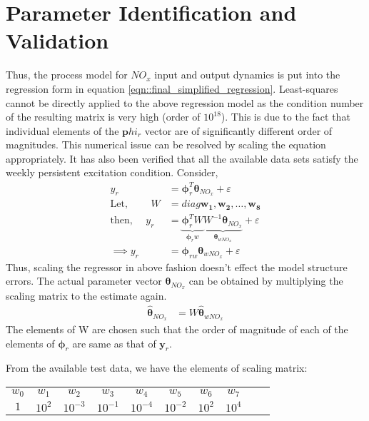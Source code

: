 \newpage
\section{Parameter Identification and Validation}

Thus, the process model for $NO_x$ input and output dynamics is put into the regression form in equation
\ref{eqn::final_simplified_regression}. Least-squares cannot be directly applied to the above regression model as the
condition number of the resulting matrix is very high (order of $10^{18}$). This is due to the fact that individual
elements of the $\pmb phi_r$ vector are of significantly different order of magnitudes. This numerical issue can be
resolved by scaling the equation appropriately. It has also been verified that all the available data sets satisfy the weekly persistent excitation condition. Consider,
\begin{align*}
        y_r &= \pmb \phi_r^T \pmb \theta_{NO_x} + \varepsilon\\
        \text{Let, } \qquad W &= diag \bm{w_1, w_2, \hdots, w_8}\\
        \text{then, } \quad y_r &= \underbrace{\pmb \phi_r^T  W}_{\pmb \phi_rw}
                        \underbrace{ W^{-1} \pmb \theta_{NO_x}}_{\pmb \theta_{wNO_x}} + \varepsilon\\
        \implies y_r &= \pmb \phi_{rw} \pmb \theta_{w NO_x} + \varepsilon
\end{align*}
Thus, scaling the regressor in above fashion doesn't effect the model structure errors. The actual parameter vector $\pmb \theta_{NO_x}$ can be obtained by multiplying the scaling matrix to the estimate again.
\begin{align*}
        \hat{\pmb \theta}_{NO_x} &= W \hat{\pmb \theta}_{wNO_x}
\end{align*}
The elements of W are chosen such that the order of magnitude of each of the elements of $\pmb \phi_r$ are same as that of $\pmb y_r$.

From the available test data, we have the elements of scaling matrix:
\begin{table}[H]
        \centering
        \begin{tabular}{c c c c c c c c c c}
                $w_0$ & $w_1$  & $w_2$     & $w_3$     & $w_4$     & $w_5$     & $w_6$  & $w_7$ \\
                $1$   & $10^2$ & $10^{-3}$ & $10^{-1}$ & $10^{-4}$ & $10^{-2}$ & $10^2$ & $10^{4}$
        \end{tabular}
\end{table}
